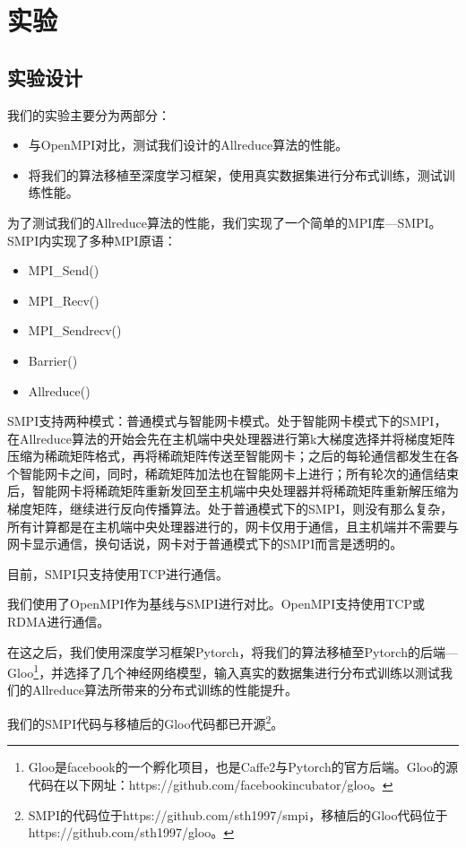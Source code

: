 \chapter{实验}
\label{chap4}

\section{实验设计}
我们的实验主要分为两部分：
\begin{itemize}
    \item 与OpenMPI对比，测试我们设计的Allreduce算法的性能。
    \item 将我们的算法移植至深度学习框架，使用真实数据集进行分布式训练，测试训练性能。
\end{itemize}

为了测试我们的Allreduce算法的性能，我们实现了一个简单的MPI库---SMPI。SMPI内实现了多种MPI原语：
\begin{itemize}
    \item MPI\_Send()
    \item MPI\_Recv()
    \item MPI\_Sendrecv()
    \item Barrier()
    \item Allreduce()
\end{itemize}

SMPI支持两种模式：普通模式与智能网卡模式。处于智能网卡模式下的SMPI，在Allreduce算法的开始会先在主机端中央处理器进行第k大梯度选择并将梯度矩阵压缩为稀疏矩阵格式，再将稀疏矩阵传送至智能网卡；之后的每轮通信都发生在各个智能网卡之间，同时，稀疏矩阵加法也在智能网卡上进行；所有轮次的通信结束后，智能网卡将稀疏矩阵重新发回至主机端中央处理器并将稀疏矩阵重新解压缩为梯度矩阵，继续进行反向传播算法。处于普通模式下的SMPI，则没有那么复杂，所有计算都是在主机端中央处理器进行的，网卡仅用于通信，且主机端并不需要与网卡显示通信，换句话说，网卡对于普通模式下的SMPI而言是透明的。

目前，SMPI只支持使用TCP进行通信。

我们使用了OpenMPI作为基线与SMPI进行对比。OpenMPI支持使用TCP或RDMA进行通信。

在这之后，我们使用深度学习框架Pytorch，将我们的算法移植至Pytorch的后端---Gloo\footnote{Gloo是facebook的一个孵化项目，也是Caffe2与Pytorch的官方后端。Gloo的源代码在以下网址：https://github.com/facebookincubator/gloo。}，并选择了几个神经网络模型，输入真实的数据集进行分布式训练以测试我们的Allreduce算法所带来的分布式训练的性能提升。

我们的SMPI代码与移植后的Gloo代码都已开源\footnote{SMPI的代码位于https://github.com/sth1997/smpi，移植后的Gloo代码位于https://github.com/sth1997/gloo。}。

